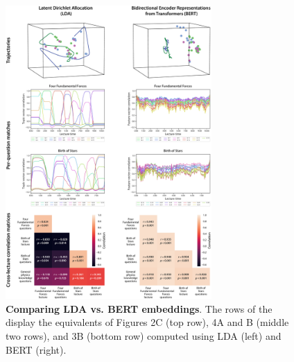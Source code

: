\documentclass[10pt]{article}
\begin{document}
\begin{figure}[tp]
    \centering
    \includegraphics[width=0.7\textwidth]{figs/model-comparison}

    \caption{\textbf{Comparing LDA vs. BERT embeddings}. The rows of the
    display the equivalents of Figures 2C (top row), 4A and B (middle two
    rows), and 3B (bottom row) computed using LDA (left) and BERT (right).}

    \label{fig:compare-bert}
\end{figure}



\newpage
\end{document}
